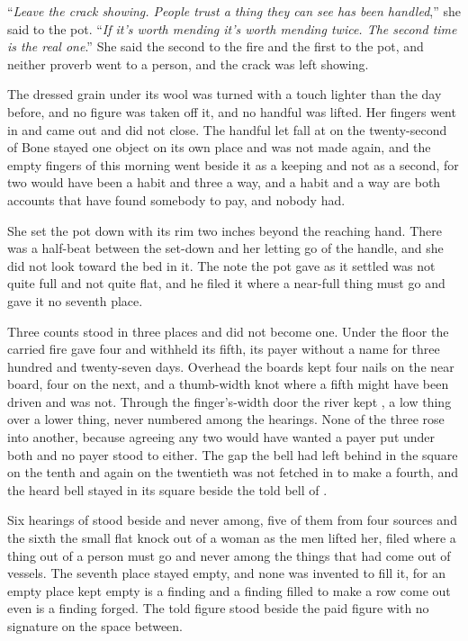 “\emph{Leave the crack showing. People trust a thing they can see has been handled},” she said to the pot. “\emph{If it's worth mending it's worth mending twice. The second time is the real one}.” She said the second to the fire and the first to the pot, and neither proverb went to a person, and the crack was left showing.

The dressed grain under its wool was turned with a touch lighter than the day before, and no figure was taken off it, and no handful was lifted. Her fingers went in and came out and did not close. The handful let fall at  on the twenty-second of Bone stayed one object on its own place and was not made again, and the empty fingers of this morning went beside it as a keeping and not as a second, for two would have been a habit and three a way, and a habit and a way are both accounts that have found somebody to pay, and nobody had.

She set the pot down with its rim two inches beyond the reaching hand. There was a half-beat between the set-down and her letting go of the handle, and she did not look toward the bed in it. The note the pot gave as it settled was not quite full and not quite flat, and he filed it where a near-full thing must go and gave it no seventh place.

\scenebreak

Three counts stood in three places and did not become one. Under the floor the carried fire gave four and withheld its fifth, its payer without a name for three hundred and twenty-seven days. Overhead the boards kept four nails on the near board, four on the next, and a thumb-width knot where a fifth might have been driven and was not. Through the finger's-width door the river kept , a low thing over a lower thing, never numbered among the hearings. None of the three rose into another, because agreeing any two would have wanted a payer put under both and no payer stood to either. The gap the bell had left behind in the square on the tenth and again on the twentieth was not fetched in to make a fourth, and the heard bell stayed in its square beside the told bell of .

Six hearings of  stood beside and never among, five of them from four sources and the sixth the small flat knock out of a woman as the men lifted her, filed where a thing out of a person must go and never among the things that had come out of vessels. The seventh place stayed empty, and none was invented to fill it, for an empty place kept empty is a finding and a finding filled to make a row come out even is a finding forged. The told figure stood beside the paid figure with no signature on the space between.

